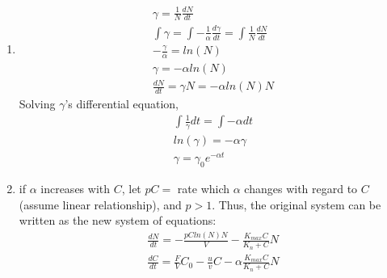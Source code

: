 \begin{homeworkProblem}[25]
\begin{enumerate}
    \item
    \begin{align*}
        \gamma = \frac{1}{N}\frac{dN}{dt} \\
        \int \gamma = \int {-\frac{1}{\alpha}\frac{d\gamma}{dt}} = \int \frac{1}{N}\frac{dN}{dt} \\
        -\frac{\gamma}{\alpha} = ln(N) \\
        \gamma = -\alpha ln(N) \\
        \frac{dN}{dt} = \gamma N = -\alpha ln(N) N
    \end{align*}
    Solving $\gamma$'s differential equation, \begin{align*}
        \int \frac{1}{\gamma}dt = \int -\alpha dt \\
        ln(\gamma) = -\alpha \gamma \\
        \gamma = \gamma_{0}e^{-\alpha t}
    \end{align*}
    
    \item
    if $\alpha$ increases with $C$, let $pC = $ rate which $\alpha$ changes with regard to $C$ (assume linear relationship), and $p>1$. Thus, the original system can be written as the new system of equations: \begin{align*}
        \frac{dN}{dt} = -\frac{pCln(N)N}{V} - \frac{K_{max}C}{K_n + C}N \\
        \frac{dC}{dt} = \frac{F}{V}C_0 - \frac{u}{v}C - \alpha\frac{K_{max}C}{K_n +C}N 
    \end{align*}
    
\end{enumerate}
\end{homeworkProblem}
